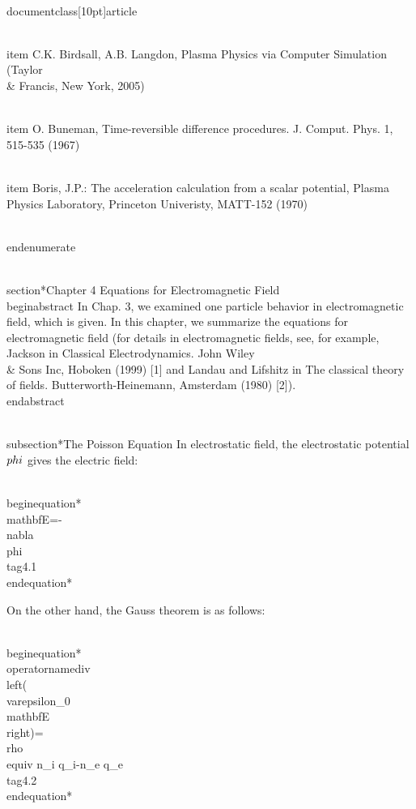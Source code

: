 \\documentclass[10pt]{article}
\begin{document}
  \\item C.K. Birdsall, A.B. Langdon, Plasma Physics via Computer Simulation (Taylor \\& Francis, New York, 2005)

  \\item O. Buneman, Time-reversible difference procedures. J. Comput. Phys. 1, 515-535 (1967)

  \\item Boris, J.P.: The acceleration calculation from a scalar potential, Plasma Physics Laboratory, Princeton Univeristy, MATT-152 (1970)

\\end{enumerate}

\\section*{Chapter 4 
 Equations for Electromagnetic Field }
\\begin{abstract}
In Chap. 3, we examined one particle behavior in electromagnetic field, which is given. In this chapter, we summarize the equations for electromagnetic field (for details in electromagnetic fields, see, for example, Jackson in Classical Electrodynamics. John Wiley \\& Sons Inc, Hoboken (1999) [1] and Landau and Lifshitz in The classical theory of fields. Butterworth-Heinemann, Amsterdam (1980) [2]).
\\end{abstract}

\\subsection*{The Poisson Equation}
In electrostatic field, the electrostatic potential $\\phi$ gives the electric field:


\\begin{equation*}
\\mathbf{E}=-\\nabla \\phi \\tag{4.1}
\\end{equation*}


On the other hand, the Gauss theorem is as follows:


\\begin{equation*}
\\operatorname{div}\\left(\\varepsilon_{0} \\mathbf{E}\\right)=\\rho \\equiv n_{i} q_{i}-n_{e} q_{e} \\tag{4.2}
\\end{equation*}
\end{document}
